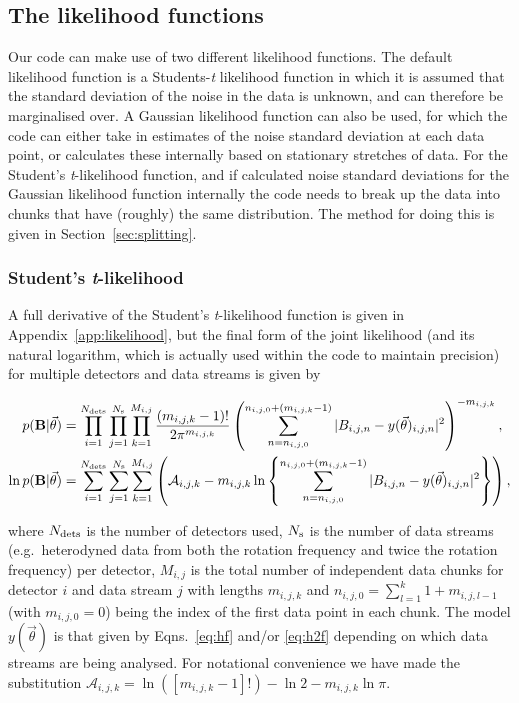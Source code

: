 \subsection{The likelihood functions}\label{sec:likelihood}

Our code can make use of two different likelihood functions. The default likelihood function is a
Students-{\it t} likelihood function in which it is assumed that the standard deviation of the noise in the
data is unknown, and can therefore be marginalised over. A Gaussian likelihood function can also be used, for
which the code can either take in estimates of the noise standard deviation at each data point, or calculates
these internally based on stationary stretches of data. For the Student's {\it t}-likelihood function, and if
calculated noise standard deviations for the Gaussian likelihood function internally the code needs to break
up the data into chunks that have (roughly) the same distribution. The method for doing this is given in
Section~\ref{sec:splitting}.

\subsubsection{Student's {\it t}-likelihood}

A full derivative of the Student's {\it t}-likelihood function \citep[see e.g.][]{2005PhRvD..72j2002D} is given
in Appendix~\ref{app:likelihood}, but the final form of the joint likelihood (and its natural logarithm,
which is actually used within the code to maintain precision) for multiple detectors and data streams is
given by
\begin{widetext}
\begin{align}\label{eq:stlikelihood}
p(\mathbf{B}|\vec{\theta}) &= \prod_{i=1}^{N_{\rm dets}} \prod_{j=1}^{N_{\rm s}} \prod_{k=1}^{M_{i,j}}
\frac{(m_{i,j,k}-1)!}{2\pi^{m_{i,j,k}}}
\left(\sum_{n=n_{i,j,0}}^{n_{i,j,0}+(m_{i,j,k}-1)} |B_{i,j,n}-y(\vec{\theta})_{i,j,n}|^2\right)^{-m_{i,j,k}},
\nonumber \\
\ln{p(\mathbf{B}|\vec{\theta})} &= \sum_{i=1}^{N_{\rm dets}} \sum_{j=1}^{N_{\rm s}}
\sum_{k=1}^{M_{i,j}} \left( \mathcal{A}_{i,j,k} - m_{i,j,k}\ln{
\left\{\sum_{n=n_{i,j,0}}^{n_{i,j,0}+(m_{i,j,k}-1)} |B_{i,j,n}-y(\vec{\theta})_{i,j,n}|^2\right\}}
\right),
\end{align}
\end{widetext}
where $N_{\rm dets}$ is the number of detectors used, $N_{\rm s}$ is the number of data streams (e.g.\
heterodyned data from both the rotation frequency and twice the rotation frequency) per detector, $M_{i,j}$ is
the total number of independent data chunks for detector $i$ and data stream $j$ with lengths $m_{i,j,k}$ and
$n_{i,j,0} = \sum_{l=1}^{k} 1+m_{i,j,l-1}$ (with $m_{i,j,0} = 0$) being the index of the first data point in
each chunk. The model $y(\vec{\theta})$ is that given by Eqns.~\ref{eq:hf} and/or \ref{eq:h2f}
depending on which data streams are being analysed. For notational convenience we have made the substitution
$\mathcal{A}_{i,j,k} = \ln{\left([m_{i,j,k}-1]!\right)} - \ln{2} - m_{i,j,k}\ln{\pi}$.

